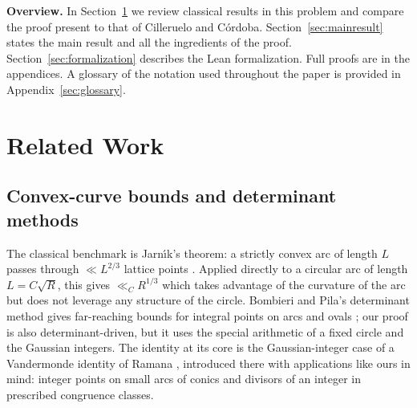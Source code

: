 \documentclass[11pt]{article}
\begin{document}

\medskip
\noindent\textbf{Overview.}
In Section~\ref{sec:related} we review classical results in this problem and compare the proof present to that of Cilleruelo and C\'ordoba.
Section~\ref{sec:mainresult} states the main result and all the ingredients of the proof.
Section~\ref{sec:formalization} describes the Lean formalization.
Full proofs are in the appendices.
A glossary of the notation used throughout the paper is provided in Appendix~\ref{sec:glossary}.

\section{Related Work}
\label{sec:related}

\subsection{Convex-curve bounds and determinant methods}
\label{subsec:determinant-methods}

The classical benchmark is Jarn\'{\i}k's theorem: a strictly convex arc of length \(L\) passes through \(\ll L^{2/3}\) lattice points \cite{Jarnik1926}.
Applied directly to a circular arc of length \(L=C\sqrt R\), this gives \(\ll_C R^{1/3}\) which takes advantage of the curvature of the arc but does not leverage any structure of the circle.
Bombieri and Pila's determinant method gives far-reaching bounds for integral points on arcs and ovals \cite{BombieriPila1989}; our proof is also determinant-driven, but it uses the special arithmetic of a fixed circle and the Gaussian integers.
The identity at its core is the Gaussian-integer case of a Vandermonde identity of Ramana \cite{Ramana2007}, introduced there with applications like ours in mind: integer points on small arcs of conics and divisors of an integer in prescribed congruence classes.
\end{document}
